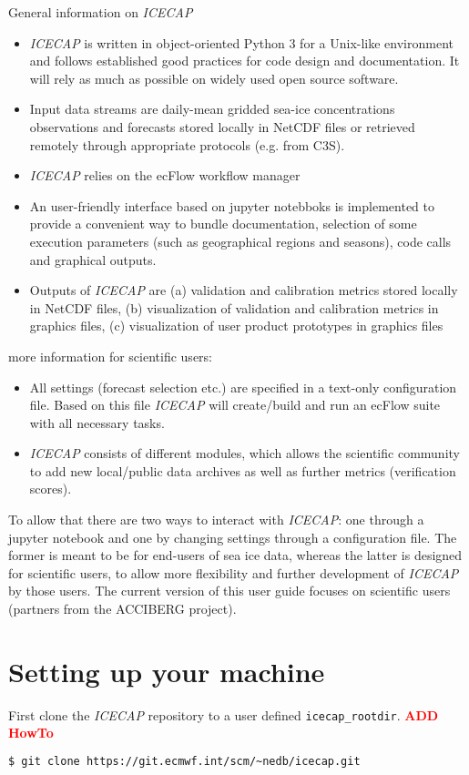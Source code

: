 \documentclass[DIV=10, parskip=full]{scrreprt}
\newcommand{\ice}{\textit{ICECAP}\xspace}
\newcommand{\tbd}[1]{\textcolor{red}{\textbf{#1}}}
\newcommand{\notimplement}[1]{#1}
\begin{document}
General information on \ice
\begin{itemize}
	\item \ice is written in object-oriented Python 3 for a Unix-like environment and follows established good practices for code design and documentation. It will rely as much as possible on widely used open source software.
	\item Input data streams are daily-mean gridded sea-ice concentrations observations and forecasts stored locally in NetCDF files or retrieved remotely through appropriate protocols (e.g. from C3S).
	\item \ice relies on the ecFlow workflow manager
	\item An user-friendly interface based on jupyter notebboks is implemented to provide a convenient way to bundle documentation, selection of some execution parameters (such as geographical regions and seasons), code calls and graphical outputs.
	\item Outputs of \ice are (a) validation and calibration metrics stored locally in NetCDF files, (b) visualization of validation and calibration metrics in graphics files, (c) visualization of user product prototypes in graphics files
\end{itemize}

more information for scientific users:
\begin{itemize}
	\item All settings (forecast selection etc.) are specified in a text-only configuration file. Based on this file \ice will create/build and run an ecFlow suite  with all necessary tasks.
	\item \ice consists of different modules, which allows the scientific community to add new local/public data archives as well as further metrics (verification scores).
\end{itemize}

To allow that there are two ways to interact with \ice: one through a \notimplement{jupyter notebook} and one by changing settings through a configuration file. The former is meant to be for end-users of sea ice data, whereas the latter is designed for scientific users, to allow more flexibility and further development of \ice by those users.  \notimplement{The current version of this user guide focuses on scientific users (partners from the ACCIBERG project)}. 



\section{Setting up your machine}\label{sec:setup}
First clone the \ice repository to a user defined \texttt{icecap\_rootdir}. \tbd{ADD HowTo}
\begin{lstlisting}[language=bash, float]
	$ git clone https://git.ecmwf.int/scm/~nedb/icecap.git
\end{lstlisting}
\end{document}
